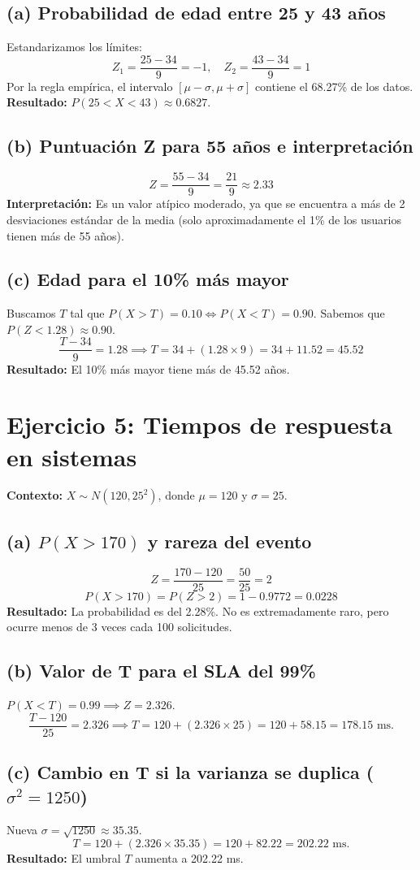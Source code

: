 \documentclass[a4paper,12pt]{article}
\begin{document}
\subsection{(a) Probabilidad de edad entre 25 y 43 años}
Estandarizamos los límites:
\[ Z_1 = \frac{25 - 34}{9} = -1, \quad Z_2 = \frac{43 - 34}{9} = 1 \]
Por la regla empírica, el intervalo $[\mu-\sigma, \mu+\sigma]$ contiene el 68.27\% de los datos.
\textbf{Resultado:} $P(25 < X < 43) \approx 0.6827$.

\subsection{(b) Puntuación Z para 55 años e interpretación}
\[ Z = \frac{55 - 34}{9} = \frac{21}{9} \approx 2.33 \]
\textbf{Interpretación:} Es un valor atípico moderado, ya que se encuentra a más de 2 desviaciones estándar de la media (solo aproximadamente el 1\% de los usuarios tienen más de 55 años).

\subsection{(c) Edad para el 10\% más mayor}
Buscamos $T$ tal que $P(X > T) = 0.10 \iff P(X < T) = 0.90$.
Sabemos que $P(Z < 1.28) \approx 0.90$.
\[ \frac{T - 34}{9} = 1.28 \implies T = 34 + (1.28 \times 9) = 34 + 11.52 = 45.52 \]
\textbf{Resultado:} El 10\% más mayor tiene más de 45.52 años.

\vspace{1em}
\newpage

\section{Ejercicio 5: Tiempos de respuesta en sistemas}
\textbf{Contexto:} $X \sim N(120, 25^2)$, donde $\mu = 120$ y $\sigma = 25$.

\subsection{(a) $P(X > 170)$ y rareza del evento}
\[ Z = \frac{170 - 120}{25} = \frac{50}{25} = 2 \]
\[ P(X > 170) = P(Z > 2) = 1 - 0.9772 = 0.0228 \]
\textbf{Resultado:} La probabilidad es del 2.28\%. No es extremadamente raro, pero ocurre menos de 3 veces cada 100 solicitudes.

\subsection{(b) Valor de T para el SLA del 99\%}
$P(X < T) = 0.99 \implies Z = 2.326$.
\[ \frac{T - 120}{25} = 2.326 \implies T = 120 + (2.326 \times 25) = 120 + 58.15 = 178.15 \text{ ms.} \]

\subsection{(c) Cambio en T si la varianza se duplica ($\sigma^2 = 1250$)}
Nueva $\sigma = \sqrt{1250} \approx 35.35$.
\[ T = 120 + (2.326 \times 35.35) = 120 + 82.22 = 202.22 \text{ ms.} \]
\textbf{Resultado:} El umbral $T$ aumenta a 202.22 ms.
\end{document}
